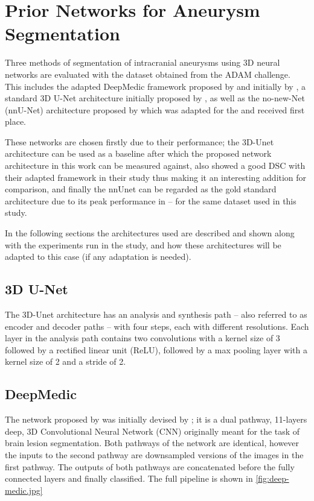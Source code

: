 \chapter{Prior Networks for Aneurysm Segmentation}
\label{chapter4}

Three methods of segmentation of intracranial aneurysms using 3D neural networks are evaluated with the dataset obtained from the ADAM challenge. This includes the adapted DeepMedic framework proposed by \citeauthor{Sichermann2019} and initially by \citeauthor{deepmedic}, a standard 3D U-Net architecture initially proposed by \citeauthor{3dunet}, as well as the no-new-Net (nnU-Net) architecture proposed by \citeauthor{nnUnet} which was adapted for the  and received first place. 

These networks are chosen firstly due to their performance; the 3D-Unet architecture can be used as a baseline after which the proposed network architecture in this work can be measured against, \citeauthor{Sichermann2019} also showed a good DSC with their adapted framework in their study thus making it an interesting addition for comparison, and finally the nnUnet can be regarded as the gold standard architecture due to its peak performance in  -- for the same dataset used in this study.

In the following sections the architectures used are described and shown along with the experiments run in the study, and how these architectures will be adapted to this case (if any adaptation is needed). 

\section{3D U-Net}
The 3D-Unet architecture has an analysis and synthesis path -- also referred to as encoder and decoder paths -- with four steps, each with different resolutions. Each layer in the analysis path contains two convolutions with a kernel size of 3 followed by a rectified linear unit (ReLU), followed by a max pooling layer with a kernel size of 2 and a stride of 2. 


\section{DeepMedic}
The network proposed by \citeauthor{Sichermann2019} was initially devised by \citeauthor{Kamnitsas2017}; it is a dual pathway, 11-layers deep, 3D Convolutional Neural Network (CNN) originally meant for the task of brain lesion segmentation. Both pathways of the network are identical, however the inputs to the second pathway are downsampled versions of the images in the first pathway. The outputs of both pathways are concatenated before the fully connected layers and finally classified. The full pipeline is shown in \ref{fig:deep-medic.jpg} 

